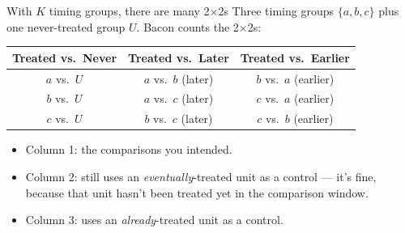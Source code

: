 \documentclass[aspectratio=169,11pt]{beamer}
\begin{document}
\begin{frame}{With $K$ timing groups, there are many 2$\times$2s}
\vspace{0.4em}
Three timing groups $\{a, b, c\}$ plus one never-treated group $U$. \;Bacon counts the 2$\times$2s:

\vspace{0.6em}
\begin{center}
\begin{tabular}{ccc}
\toprule
\textbf{Treated vs.\ Never} & \textbf{Treated vs.\ Later} & \textbf{Treated vs.\ Earlier} \\
\midrule
$a$ vs.\ $U$ & $a$ vs.\ $b$ \;(later) & $b$ vs.\ $a$ \;(earlier) \\
$b$ vs.\ $U$ & $a$ vs.\ $c$ \;(later) & $c$ vs.\ $a$ \;(earlier) \\
$c$ vs.\ $U$ & $b$ vs.\ $c$ \;(later) & $c$ vs.\ $b$ \;(earlier) \\
\bottomrule
\end{tabular}
\end{center}

\vspace{0.7em}
\begin{itemize}\small
  \item Column 1: the comparisons you intended.
  \item Column 2: still uses an \textit{eventually}-treated unit as a control --- it's fine, because that unit hasn't been treated yet in the comparison window.
  \item Column 3: uses an \textit{already}-treated unit as a control. \;
\end{itemize}
\end{frame}
\end{document}
